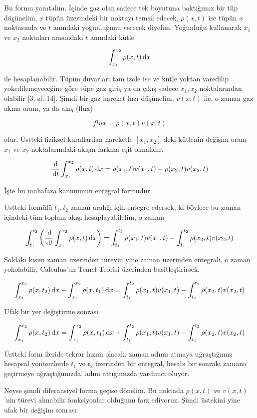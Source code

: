 \documentclass[12pt,fleqn]{article}\usepackage{../../common}
\begin{document}
Bu formu yaratalım. İçinde gaz olan sadece tek boyutuna baktığımız bir tüp
düşünelim, $x$ tüpün üzerindeki bir noktayı temsil edecek, $\rho(x,t)$ ise tüpün
$x$ noktasında ve $t$ anındaki yoğunluğunu verecek diyelim. Yoğunluğu kullanarak
$x_1$ ve $x_2$ noktaları arasındaki $t$ anındaki kütle

$$
\int _{x_1}^{x_2} \rho(x,t) \,\mathrm{d} x
$$

ile hesaplanabilir. Tüpün duvarları tam izole ise ve kütle yoktan varedilip
yokedilemeyeceğine göre tüpe gaz giriş ya da çıkış sadece $x_1,x_2$
noktalarından olabilir [3, sf. 14]. Şimdi bir gaz hareket hızı düşünelim,
$v(x,t)$ ile, o zaman gaz akma oranı, ya da akış (flux)

$$
flux = \rho(x,t) v(x,t)
$$

olur. Üstteki fiziksel kurallardan hareketle $[x_1,x_2]$ deki kütlenin
değişim oranı $x_1$ ve $x_2$ noktalarındaki akışın farkına eşit olmalıdır,

$$
\frac{\,\mathrm{d}}{\,\mathrm{d} t} \int _{x_1}^{x_2} \rho(x,t) \,\mathrm{d} x =
\rho(x_1,t) v(x_1,t) - \rho(x_2,t) v(x_2,t)
$$

İşte bu muhafaza kanununun entegral formudur. 

Üstteki formülü $t_1,t_2$ zaman aralığı için entegre edersek, ki böylece
bu zaman içindeki tüm toplam akışı hesaplayabilelim, o zaman

$$
\int_{t_1}^{t_2} \left( \frac{\,\mathrm{d}}{\,\mathrm{d} t} \int _{x_1}^{x_2} \rho(x,t) \,\mathrm{d} x  \right)  =
\int_{t_1}^{t_2} \rho(x_1,t) v(x_1,t) - \int_{t_1}^{t_2}  \rho(x_2,t) v(x_2,t) 
$$

Soldaki kısım zaman üzerinden türevin yine zaman üzerinden entegrali, o zaman
yokolabilir, Calculus'un Temel Teorisi üzerinden basitleştirirsek,

$$
\int _{x_1}^{x_2} \rho(x,t_2) \,\mathrm{d} x - \int _{x_1}^{x_2} \rho(x,t_1) \,\mathrm{d} x  = 
\int_{t_1}^{t_2} \rho(x_1,t) v(x_1,t) - \int_{t_1}^{t_2}  \rho(x_2,t) v(x_2,t) 
$$

Ufak bir yer değiştirme sonrası

$$
\int _{x_1}^{x_2} \rho(x,t_2) \,\mathrm{d} x =
\int _{x_1}^{x_2} \rho(x,t_1) \,\mathrm{d} x  +
\int_{t_1}^{t_2} \rho(x_1,t) v(x_1,t) -
\int_{t_1}^{t_2}  \rho(x_2,t) v(x_2,t) 
$$

Üstteki form ileride tekrar lazım olacak, zaman adımı atmaya uğraştığımız
hesapsal yöntemlerde $t_1$ ve $t_2$ üzerinden bir entegral, hesabı bir sonraki
zamana geçirmeye uğraştığımızda, adım attığımızda yardımcı oluyor.

Neyse şimdi diferansiyel forma geçise dönelim. Bu noktada $\rho(x,t)$ ve
$v(x,t)$'nin türevi alınabilir fonksiyonlar olduğunu farz ediyoruz. Şimdi
üstekini yine ufak bir değişim sonrası
\end{document}
